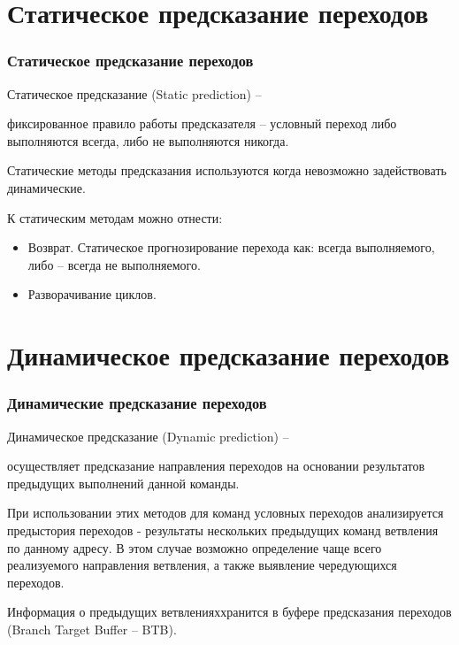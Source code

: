 \documentclass{beamer}
\begin{document}
\section{Статическое предсказание переходов}

\begin{frame}
\frametitle{Статическое предсказание переходов}

\begin{block}{Статическое предсказание (Static prediction) –}

фиксированное правило работы предсказателя – условный переход либо выполняются всегда, либо не выполняются никогда.
\end{block}

Статические методы предсказания используются когда невозможно задействовать динамические.

К статическим методам можно отнести:
\begin{itemize}
\item Возврат. Статическое прогнозирование перехода как: всегда выполняемого, либо – всегда не выполняемого.
\item Разворачивание циклов.
\end{itemize}

\end{frame}

\section{Динамическое предсказание переходов}

\begin{frame}
\frametitle{Динамические предсказание переходов}

\begin{block}{Динамическое предсказание (Dynamic prediction) –}

осуществляет предсказание направления переходов на основании результатов предыдущих выполнений данной команды.
\end{block}

При использовании этих методов для команд условных переходов анализируется предыстория переходов - результаты нескольких предыдущих команд ветвления по данному адресу. В этом случае возможно определение чаще всего реализуемого направления ветвления, а также выявление чередующихся переходов.

Информация о предыдущих ветвленияххранится в буфере предсказания переходов (Branch Target Buffer – BTB).

\end{frame}
\end{document}
